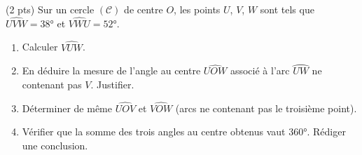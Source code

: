 \documentclass[11pt]{article}
\begin{document}
\begin{exercice} \hfill (2 pts)
Sur un cercle $(\mathcal{C})$ de centre $O$, les points $U$, $V$, $W$ sont tels que $\widehat{UVW} = 38°$ et $\widehat{VWU} = 52°$.
\begin{enumerate}
\item Calculer $\widehat{VUW}$.
\item En déduire la mesure de l'angle au centre $\widehat{UOW}$ associé à l'arc $\wideparen{UW}$ ne contenant pas $V$. Justifier.
\item Déterminer de même $\widehat{UOV}$ et $\widehat{VOW}$ (arcs ne contenant pas le troisième point).
\item Vérifier que la somme des trois angles au centre obtenus vaut $360°$. Rédiger une conclusion.
\end{enumerate}
\end{exercice}
\end{document}
